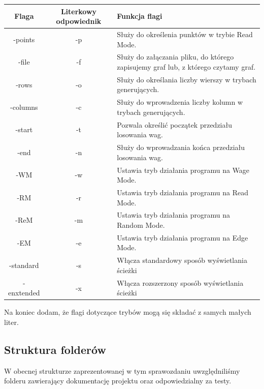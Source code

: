 \documentclass[10pt, a4paper]{report}
\begin{document}
    \begin{tabularx}{\textwidth}{ c|c|X }
        \hline Flaga & Literkowy odpowiednik & Funkcja flagi \\
        \hline -points & -p & Służy do określenia punktów w trybie Read Mode.\\
        \hline -file & -f & Służy do załączania pliku, do którego zapisujemy graf lub, z którego czytamy graf.\\
        \hline -rows & -o & Służy do określania liczby wierszy w trybach generujących.\\
        \hline -columns & -c & Służy do wprowadzenia liczby kolumn w trybach generujących.\\
        \hline -start & -t & Pozwala określić początek przedziału losowania wag.\\
        \hline -end & -n & Służy do wprowadzania końca przedziału losowania wag.\\
        \hline -WM & -w & Ustawia tryb działania programu na Wage Mode.\\
        \hline -RM & -r & Ustawia tryb działania programu na Read Mode.\\
        \hline -ReM & -m & Ustawia tryb działania programu na Random Mode.\\
        \hline -EM & -e & Ustawia tryb działania programu na Edge Mode.\\
        \hline -standard & -s & Włącza standardowy sposób wyświetlania ścieżki\\
        \hline -enxtended & -x & Włącza rozszerzony sposób wyświetlania ścieżki\\
        \hline
    \end{tabularx}
    \newline\newline Na koniec dodam, że flagi dotyczące trybów mogą się składać z samych małych liter.

    \subsection{Struktura folderów}
    W obecnej strukturze zaprezentowanej w tym sprawozdaniu uwzględniliśmy folderu zawierający dokumentację projektu oraz odpowiedzialny za testy.
\end{document}
